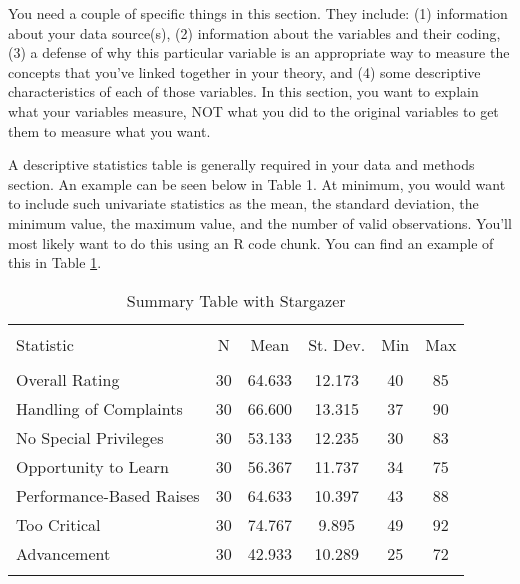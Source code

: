 \documentclass[12pt]{article}
\begin{document}
You need a couple of specific things in this section. They include: (1) information about your data source(s), (2) information about the variables and their coding, (3) a defense of why this particular variable is an appropriate way to measure the concepts that you've linked together in your theory, and (4) some descriptive characteristics of each of those variables. In this section, you want to explain what your variables measure, NOT what you did to the original variables to get them to measure what you want.

A descriptive statistics table is generally required in your data and methods section. An example can be seen below in Table 1. At minimum, you would want to include such univariate statistics as the mean, the standard deviation, the minimum value, the maximum value, and the number of valid observations. You'll most likely want to do this using an R code chunk. You can find an example of this in Table \ref{tab:desc}.

\begin{table}[ht] \centering 
  \caption{Summary Table with Stargazer} 
  \label{tab:desc} 
\begin{tabular}{@{\extracolsep{5pt}}lccccc} 
\\[-1.8ex]\hline \\[-1.8ex] 
Statistic & \multicolumn{1}{c}{N} & \multicolumn{1}{c}{Mean} & \multicolumn{1}{c}{St. Dev.} & \multicolumn{1}{c}{Min} & \multicolumn{1}{c}{Max} \\ 
\hline \\[-1.8ex] 
Overall Rating & 30 & 64.633 & 12.173 & 40 & 85 \\ 
Handling of Complaints & 30 & 66.600 & 13.315 & 37 & 90 \\ 
No Special Privileges & 30 & 53.133 & 12.235 & 30 & 83 \\ 
Opportunity to Learn & 30 & 56.367 & 11.737 & 34 & 75 \\ 
Performance-Based Raises & 30 & 64.633 & 10.397 & 43 & 88 \\ 
Too Critical & 30 & 74.767 & 9.895 & 49 & 92 \\ 
Advancement & 30 & 42.933 & 10.289 & 25 & 72 \\ 
\hline \\[-1.8ex] 
\end{tabular} 
\end{table}
\end{document}

